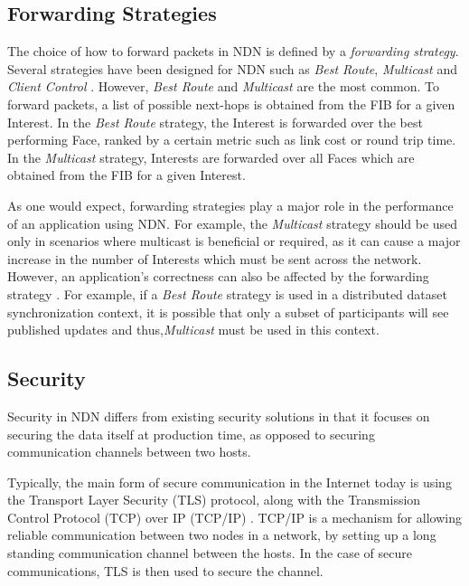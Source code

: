 \subsection{Forwarding Strategies}\label{sec:sota:forwarding-strats}
The choice of how to forward packets in NDN is defined by a \textit{forwarding strategy}. Several strategies have been designed for NDN such as \textit{Best Route}, \textit{Multicast} and \textit{Client Control} \cite{ndn-sim-forwarding-strategies}. However, \textit{Best Route} and \textit{Multicast} are the most common. To forward packets, a list of possible next-hops is obtained from the FIB for a given Interest. In the \textit{Best Route} strategy, the Interest is forwarded over the best performing Face, ranked by a certain metric such as link cost or round trip time. In the \textit{Multicast} strategy, Interests are forwarded over all Faces which are obtained from the FIB for a given Interest.

As one would expect, forwarding strategies play a major role in the performance of an application using NDN. For example, the \textit{Multicast} strategy should be used only in scenarios where multicast is beneficial or required, as it can cause a major increase in the number of Interests which must be sent across the network. However, an application’s correctness can also be affected by the forwarding strategy \cite{forwarding-strategies}. For example, if a \textit{Best Route} strategy is used in a distributed dataset synchronization context, it is possible that only a subset of participants will see published updates and thus,\textit{Multicast} must be used in this context.



\subsection{Security}
Security in NDN differs from existing security solutions in that it focuses on securing the data itself at production time, as opposed to securing communication channels between two hosts.  

Typically, the main form of secure communication in the Internet today is using the Transport Layer Security (TLS) protocol, along with the Transmission Control Protocol (TCP) over IP (TCP/IP) \cite{TLS}. TCP/IP is a mechanism for allowing reliable communication between two nodes in a network, by setting up a long standing communication channel between the hosts. In the case of secure communications, TLS is then used to secure the channel. 


